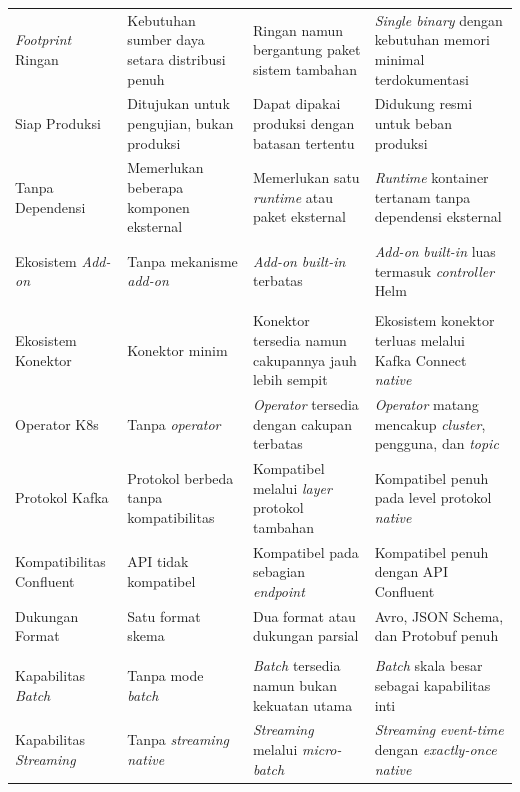 {\begin{longtable}{|>{\raggedright\arraybackslash}m{2.6cm}|>{\raggedright\arraybackslash}m{3.4cm}|>{\raggedright\arraybackslash}m{3.5cm}|>{\raggedright\arraybackslash}m{3.5cm}|}
\multicolumn{4}{|l|}{\textbf{Distribusi Kubernetes}} \\
\hline
\textit{Footprint} Ringan & Kebutuhan sumber daya setara distribusi penuh & Ringan namun bergantung paket sistem tambahan & \textit{Single binary} dengan kebutuhan memori minimal terdokumentasi \\
\hline
Siap Produksi & Ditujukan untuk pengujian, bukan produksi & Dapat dipakai produksi dengan batasan tertentu & Didukung resmi untuk beban produksi \\
\hline
Tanpa Dependensi & Memerlukan beberapa komponen eksternal & Memerlukan satu \textit{runtime} atau paket eksternal & \textit{Runtime} kontainer tertanam tanpa dependensi eksternal \\
\hline
Ekosistem \textit{Add-on} & Tanpa mekanisme \textit{add-on} & \textit{Add-on} \textit{built-in} terbatas & \textit{Add-on} \textit{built-in} luas termasuk \textit{controller} Helm \\
\hline
\multicolumn{4}{|l|}{\textbf{\textit{Message Broker} dan \textit{Schema Registry}}} \\
\hline
Ekosistem Konektor & Konektor minim & Konektor tersedia namun cakupannya jauh lebih sempit & Ekosistem konektor terluas melalui Kafka Connect \textit{native} \\
\hline
Operator K8s & Tanpa \textit{operator} & \textit{Operator} tersedia dengan cakupan terbatas & \textit{Operator} matang mencakup \textit{cluster}, pengguna, dan \textit{topic} \\
\hline
Protokol Kafka & Protokol berbeda tanpa kompatibilitas & Kompatibel melalui \textit{layer} protokol tambahan & Kompatibel penuh pada level protokol \textit{native} \\
\hline
Kompati\-bilitas Confluent & API tidak kompatibel & Kompatibel pada sebagian \textit{endpoint} & Kompatibel penuh dengan API Confluent \\
\hline
Duku\-ngan Format & Satu format skema & Dua format atau dukungan parsial & Avro, JSON Schema, dan Protobuf penuh \\
\hline
\multicolumn{4}{|l|}{\textbf{Pemrosesan Data}} \\
\hline
Kapa\-bilitas \textit{Batch} & Tanpa mode \textit{batch} & \textit{Batch} tersedia namun bukan kekuatan utama & \textit{Batch} skala besar sebagai kapabilitas inti \\
\hline
Kapa\-bilitas \textit{Streaming} & Tanpa \textit{streaming} \textit{native} & \textit{Streaming} melalui \textit{micro-batch} & \textit{Streaming} \textit{event-time} dengan \textit{exactly-once} \textit{native} \\

\end{longtable}}

